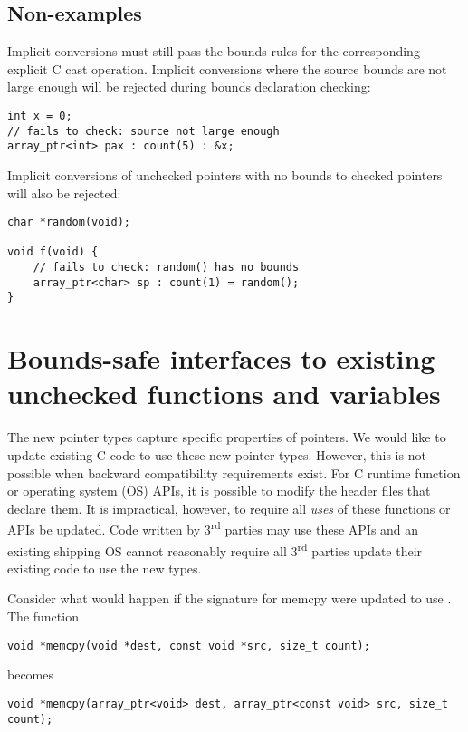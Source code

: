 \subsection{Non-examples}

Implicit conversions must still pass the bounds rules for the corresponding explicit
C cast operation.  Implicit conversions where the source bounds are not large
enough will be rejected during bounds declaration checking:
\begin{verbatim}
int x = 0;
// fails to check: source not large enough
array_ptr<int> pax : count(5) : &x;
\end{verbatim}

Implicit conversions of unchecked pointers with no bounds to checked pointers
will also be rejected:
\begin{verbatim}
char *random(void);

void f(void) {
    // fails to check: random() has no bounds
    array_ptr<char> sp : count(1) = random(); 
}
\end{verbatim}

\section{Bounds-safe interfaces to existing unchecked functions and variables}
\label{section:function-bounds-safe-interfaces}

The new pointer types capture specific properties of pointers. We would
like to update existing C code to use these new pointer types. However,
this is not possible when backward compatibility requirements exist. 
For C runtime function or operating system (OS) APIs, it is possible
to modify the header files that declare them. It is impractical, however,
to require  all {\em uses} of these functions or APIs be updated.   Code written by
3\textsuperscript{rd} 
parties may use these APIs and an existing shipping OS cannot reasonably require all
3\textsuperscript{rd} parties update their existing code to use the new
types.

Consider what would happen if the signature for memcpy were updated to
use \arrayptr. The function

\begin{verbatim}
void *memcpy(void *dest, const void *src, size_t count);
\end{verbatim}

becomes

\begin{verbatim}
void *memcpy(array_ptr<void> dest, array_ptr<const void> src, size_t count);
\end{verbatim}

